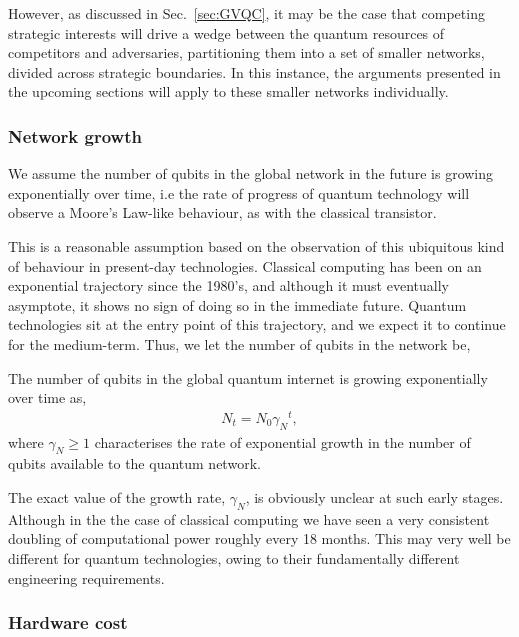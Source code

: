 However, as discussed in Sec.~\ref{sec:GVQC}, it may be the case that competing strategic interests will drive a wedge between the quantum resources of competitors and adversaries, partitioning them into a set of smaller networks, divided across strategic boundaries. In this instance, the arguments presented in the upcoming sections will apply to these smaller networks individually.

%
%

\subsubsection{Network growth} 

We assume the number of qubits in the global network in the future is growing exponentially over time, i.e the rate of progress of quantum technology will observe a Moore's Law-like behaviour, as with the classical transistor.

This is a reasonable assumption based on the observation of this ubiquitous kind of behaviour in present-day technologies. Classical computing has been on an exponential trajectory since the 1980's, and although it must eventually asymptote, it shows no sign of doing so in the immediate future. Quantum technologies sit at the entry point of this trajectory, and we expect it to continue for the medium-term. Thus, we let the number of qubits in the network be,
\begin{postulate}\label{post:net_growth}
The number of qubits in the global quantum internet is growing exponentially over time as,
\begin{align}
	N_t = N_0 {\gamma_N}^{t},
\end{align}
where \mbox{$\gamma_N\geq 1$} characterises the rate of exponential growth in the number of qubits available to the quantum network.
\end{postulate}

The exact value of the growth rate, $\gamma_N$, is obviously unclear at such early stages. Although in the the case of classical computing we have seen a very consistent doubling of computational power roughly every 18 months. This may very well be different for quantum technologies, owing to their fundamentally different engineering requirements.

%
%

\subsubsection{Hardware cost} 

